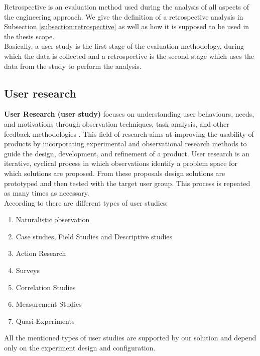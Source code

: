 Retrospective is an evaluation method used during the analysis of all aspects of the engineering approach. We give the definition of a retrospective analysis in Subsection \ref{subsection:retrospective} as well as how it is supposed to be used in the thesis scope.\\ 

Basically, a user study is the first stage of the evaluation methodology, during which the data is collected and a retrospective is the second stage which uses the data from the study to perform the analysis. 

\subsection{User research}\label{subsection:user_study}

\textbf{User Research (user study)} focuses on understanding user behaviours, needs, and motivations through observation techniques, task analysis, and other feedback methodologies \cite{kuniavsky}. This field of research aims at improving the usability of products by incorporating experimental and observational research methods to guide the design, development, and refinement of a product.  User research is an iterative, cyclical process in which observations identify a problem space for which solutions are proposed. From these proposals design solutions are prototyped and then tested with the target user group. This process is repeated as many times as necessary.\\

According to \cite{leroy} there are different types of user studies: 
\begin{enumerate}
	\item Naturalistic observation
	\item Case studies, Field Studies and Descriptive studies
	\item Action Research
	\item Surveys
	\item Correlation Studies
	\item Measurement Studies
	\item Quasi-Experiments
\end{enumerate}

All the mentioned types of user studies are supported by our solution and depend only on the experiment design and configuration.\\

